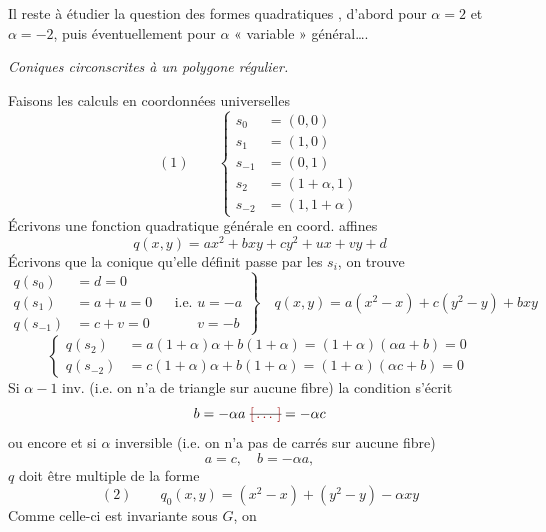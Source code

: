 \documentclass[11pt,a4paper]{article}
\begin{document}
Il reste à étudier la question des formes quadratiques  , d'abord pour $\alpha = 2$ et $\alpha = -2$, puis éventuellement pour $\alpha$ « variable » général….

\emph{Coniques circonscrites à un polygone régulier.}

Faisons les calculs en coordonnées universelles
\[
  (1) \qquad
  \left\{
  \begin{aligned}
    s_0 &= (0,0) \\
    s_1 &= (1,0) \\
    s_{-1} &= (0,1) \\
    s_2 &= (1 + \alpha, 1) \\
    s_{-2} &= (1, 1 + \alpha)
  \end{aligned}
  \right.
\]
Écrivons une fonction quadratique générale en coord. affines
\[
  q(x,y) = a x^2 + b xy + c y^2 + u x + v y + d
\]
\struck{\ill{}} Écrivons que la  conique qu'elle définit  passe par les $s_i$, on trouve
\[
  \left.
  \begin{aligned}
    q(s_0) &= d = 0 \\
    q(s_1) &= a + u = 0 && \text{i.e. } u = -a \\
    q(s_{-1}) &= c + v = 0 && \phantom{\text{i.e. }} v = -b
  \end{aligned}
  \right\}
  \quad q(x,y) = a(x^2 - x) + c(y^2 - y) + bxy
\]
\[
  \left\{
  \begin{aligned}
    q(s_2) &= a(1+\alpha)\alpha + b(1+\alpha) = (1+\alpha)(\alpha a + b) = 0 \\
    q(s_{-2}) &= c(1+\alpha)\alpha + b(1+\alpha) = (1+\alpha)(\alpha c + b) = 0
  \end{aligned}
  \right.
\]
Si $\alpha - 1$ inv. (i.e. on n'a de triangle sur aucune fibre) la condition s'écrit
\[
  b = -\alpha a \ \text{\struck{\ill{}}} = -\alpha c
\]
ou encore et si $\alpha$ inversible (i.e. on n'a pas de carrés sur aucune fibre)
\[
  a = c, \quad b = -\alpha a,
\]
 $q$ doit être multiple  de la forme
\[
  (2) \qquad q_0(x,y) = (x^2 - x) + (y^2 - y) - \alpha xy
\]
Comme celle-ci est invariante sous $G$, on
\end{document}
